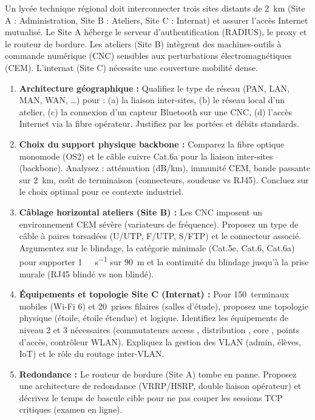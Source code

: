 \documentclass[11pt]{article}
\begin{document}
\begin{exercice}
Un lycée technique régional doit interconnecter trois sites distants de \SI{2}{km} (Site A : Administration, Site B : Ateliers, Site C : Internat) et assurer l'accès Internet mutualisé. Le Site A héberge le serveur d'authentification (RADIUS), le proxy et le routeur de bordure. Les ateliers (Site B) intègrent des machines-outils à commande numérique (CNC) sensibles aux perturbations électromagnétiques (CEM). L'internat (Site C) nécessite une couverture mobilité dense.
\begin{enumerate}
    \item \textbf{Architecture géographique :} Qualifiez le type de réseau (PAN, LAN, MAN, WAN, \dots) pour : (a) la liaison inter-sites, (b) le réseau local d'un atelier, (c) la connexion d'un capteur Bluetooth sur une CNC, (d) l'accès Internet via la fibre opérateur. Justifiez par les portées et débits standards.
    \item \textbf{Choix du support physique backbone :} Comparez la fibre optique monomode (OS2) et le câble cuivre Cat.6a pour la liaison inter-sites (backbone). Analysez : atténuation (\si{\deci\bel/\kilo\meter}), immunité CEM, bande passante sur \SI{2}{km}, coût de terminaison (connecteurs, soudeuse vs RJ45). Concluez sur le choix optimal pour ce contexte industriel.
    \item \textbf{Câblage horizontal ateliers (Site B) :} Les CNC imposent un environnement CEM sévère (variateurs de fréquence). Proposez un type de câble à paires torsadées (U/UTP, F/UTP, S/FTP) et le connecteur associé. Argumentez sur le blindage, la catégorie minimale (Cat.5e, Cat.6, Cat.6a) pour supporter \SI{1}{\giga\bit\per\second} sur \SI{90}{m} et la continuité du blindage jusqu'à la prise murale (RJ45 blindé vs non blindé).
    \item \textbf{Équipements et topologie Site C (Internat) :} Pour \SI{150}{terminaux} mobiles (Wi-Fi 6) et \SI{20}{prises} filaires (salles d'étude), proposez une topologie physique (étoile, étoile étendue) et logique. Identifiez les équipements de niveau 2 et 3 nécessaires (commutateurs \og access \fg, \og distribution \fg, \og core \fg, points d'accès, contrôleur WLAN). Expliquez la gestion des VLAN (admin, élèves, IoT) et le rôle du routage inter-VLAN.
    \item \textbf{Redondance :} Le routeur de bordure (Site A) tombe en panne. Proposez une architecture de redondance (VRRP/HSRP, double liaison opérateur) et décrivez le temps de bascule cible pour ne pas couper les sessions TCP critiques (examen en ligne).
\end{enumerate}
\end{exercice}
\end{document}
